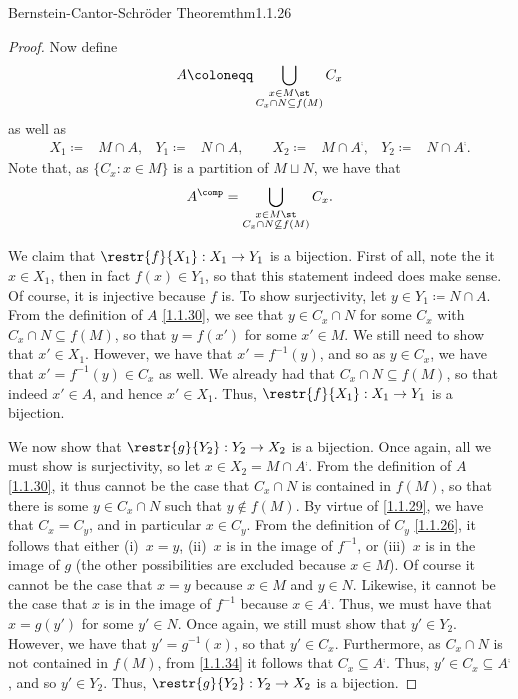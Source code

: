 \begin{thm}{Bernstein-Cantor-Schröder Theorem}{thm1.1.26}
\begin{proof}
		Now define
		\begin{equation}\label{1.1.30}
		A\coloneqq \bigcup _{\substack{x\in M\st \\ C_x\cap N\subseteq f(M)}}C_x
		\end{equation}
		as well as
		\begin{subequations}
		\begin{align}
		X_1\coloneqq&M\cap A, & Y_1\coloneqq&N\cap A,\qquad X_2\coloneqq&M\cap A^{\comp}, & Y_2\coloneqq&N\cap A^{\comp}.
		\end{align}
		\end{subequations}
		Note that, as $\{ C_x:x\in M\}$ is a partition of $M\sqcup N$, we have that
		\begin{equation}\label{1.1.34}
		A^{\comp}=\bigcup _{\substack{x\in M\st \\ C_x\cap N\not \subseteq f(M)}}C_x.
		\end{equation}
		
		We claim that $\restr{f}{X_1}:X_1\rightarrow Y_1$ is a bijection.  First of all, note the it $x\in X_1$, then in fact $f(x)\in Y_1$, so that this statement indeed does make sense.  Of course, it is injective because $f$ is.  To show surjectivity, let $y\in Y_1\coloneqq N\cap A$.  From the definition of $A$ \eqref{1.1.30}, we see that $y\in C_x\cap N$ for some $C_x$ with $C_x\cap N\subseteq f(M)$, so that $y=f(x')$ for some $x'\in M$.  We still need to show that $x'\in X_1$.  However, we have that $x'=f^{-1}(y)$, and so as $y\in C_x$, we have that $x'=f^{-1}(y)\in C_x$ as well.  We already had that $C_x\cap N\subseteq f(M)$, so that indeed $x'\in A$, and hence $x'\in X_1$.  Thus, $\restr{f}{X_1}:X_1\rightarrow Y_1$ is a bijection.
		
		We now show that $\restr{g}{Y_2}:Y_2\rightarrow X_2$ is a bijection.  Once again, all we must show is surjectivity, so let $x\in X_2=M\cap A^{\comp}$. From the definition of $A$ \eqref{1.1.30}, it thus cannot be the case that $C_x\cap N$ is contained in $f(M)$, so that there is some $y\in C_x\cap N$ such that $y\notin f(M)$.  By virtue of \eqref{1.1.29}, we have that $C_x=C_y$, and in particular $x\in C_y$.  From the definition of $C_y$ \eqref{1.1.26}, it follows that either (i)~$x=y$, (ii)~$x$ is in the image of $f^{-1}$, or (iii)~$x$ is in the image of $g$ (the other possibilities are excluded because $x\in M$).  Of course it cannot be the case that $x=y$ because $x\in M$ and $y\in N$.  Likewise, it cannot be the case that $x$ is in the image of $f^{-1}$ because $x\in A^{\comp}$.  Thus, we must have that $x=g(y')$ for some $y'\in N$.  Once again, we still must show that $y'\in Y_2$.  However, we have that $y'=g^{-1}(x)$, so that $y'\in C_x$.  Furthermore, as $C_x\cap N$ is not contained in $f(M)$, from \eqref{1.1.34} it follows that $C_x\subseteq A^{\comp}$.  Thus, $y'\in C_x\subseteq A^{\comp}$, and so $y'\in Y_2$.  Thus, $\restr{g}{Y_2}:Y_2\rightarrow X_2$ is a bijection.
		

\end{proof}
\end{thm}
